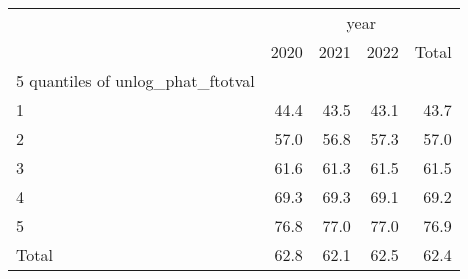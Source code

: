 \begin{tabular}{lllll}
\cline{1-5}
\multicolumn{1}{c}{} &
  \multicolumn{4}{|c}{year} \\
\multicolumn{1}{c}{} &
  \multicolumn{1}{|r}{2020} &
  \multicolumn{1}{r}{2021} &
  \multicolumn{1}{r}{2022} &
  \multicolumn{1}{r}{Total} \\
\cline{1-5}
\multicolumn{1}{l}{5 quantiles of unlog\_phat\_ftotval} &
  \multicolumn{1}{|r}{} &
  \multicolumn{1}{r}{} &
  \multicolumn{1}{r}{} &
  \multicolumn{1}{r}{} \\
\multicolumn{1}{l}{\hspace{1em}1} &
  \multicolumn{1}{|r}{44.4} &
  \multicolumn{1}{r}{43.5} &
  \multicolumn{1}{r}{43.1} &
  \multicolumn{1}{r}{43.7} \\
\multicolumn{1}{l}{\hspace{1em}2} &
  \multicolumn{1}{|r}{57.0} &
  \multicolumn{1}{r}{56.8} &
  \multicolumn{1}{r}{57.3} &
  \multicolumn{1}{r}{57.0} \\
\multicolumn{1}{l}{\hspace{1em}3} &
  \multicolumn{1}{|r}{61.6} &
  \multicolumn{1}{r}{61.3} &
  \multicolumn{1}{r}{61.5} &
  \multicolumn{1}{r}{61.5} \\
\multicolumn{1}{l}{\hspace{1em}4} &
  \multicolumn{1}{|r}{69.3} &
  \multicolumn{1}{r}{69.3} &
  \multicolumn{1}{r}{69.1} &
  \multicolumn{1}{r}{69.2} \\
\multicolumn{1}{l}{\hspace{1em}5} &
  \multicolumn{1}{|r}{76.8} &
  \multicolumn{1}{r}{77.0} &
  \multicolumn{1}{r}{77.0} &
  \multicolumn{1}{r}{76.9} \\
\multicolumn{1}{l}{\hspace{1em}Total} &
  \multicolumn{1}{|r}{62.8} &
  \multicolumn{1}{r}{62.1} &
  \multicolumn{1}{r}{62.5} &
  \multicolumn{1}{r}{62.4} \\
\cline{1-5}
\end{tabular}
